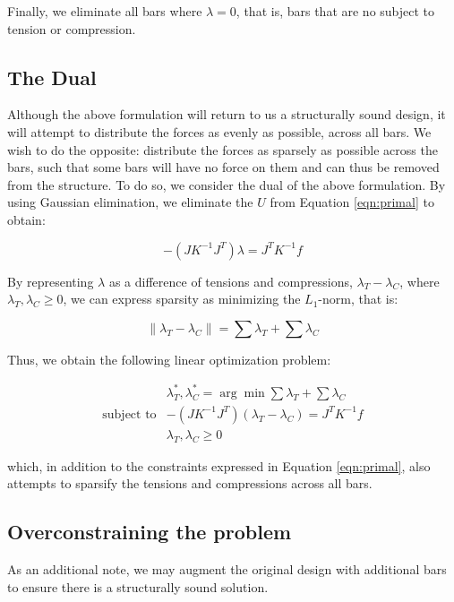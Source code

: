 \documentclass[11pt]{article}
\theoremstyle{definition}
\begin{document}
Finally, we eliminate all bars where $\lambda = 0$, that is, bars that are no
subject to tension or compression.

\subsection{The Dual}

Although the above formulation will return to us a structurally sound design, it
will attempt to distribute the forces as evenly as possible, across all bars. We
wish to do the opposite: distribute the forces as sparsely as possible across
the bars, such that some bars will have no force on them and can thus be removed
from the structure. To do so, we consider the dual of the above formulation. By
using Gaussian elimination, we eliminate the $U$ from Equation \ref{eqn:primal} to
obtain:

\begin{equation}
  -(J K^{-1} J^T) \lambda = J^T K^{-1} f
\end{equation}

By representing $\lambda$ as a difference of tensions and compressions, $\lambda_T
- \lambda_C$, where $\lambda_T, \lambda_C \ge 0$, we can express sparsity as
minimizing the $L_1$-norm, that is: 

\[
  \lVert \lambda_T - \lambda_C \rVert = \sum \lambda_T + \sum \lambda_C
\]

Thus, we obtain the following linear optimization problem:

\begin{equation}
  \begin{split}
  & \lambda^*_T, \lambda^*_C = \arg \min \sum \lambda_T + \sum \lambda_C \\
  \text{subject to} & -(J K^{-1} J^T) (\lambda_T - \lambda_C) = J^T
  K^{-1} f \\
  & \lambda_T, \lambda_C \ge 0
  \end{split}
  \label{eqn:dual}
\end{equation}

which, in addition to the constraints expressed in Equation \ref{eqn:primal},
also attempts to sparsify the tensions and compressions across all bars.

\subsection{Overconstraining the problem}
As an additional note, we may augment the original design with additional bars
to ensure there is a structurally sound solution.
\end{document}
